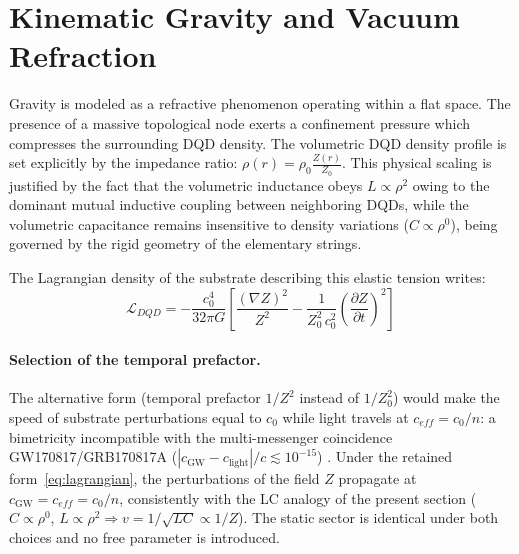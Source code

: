 \documentclass[11pt,a4paper]{article}
\theoremstyle{plain}
\theoremstyle{remark}
\begin{document}
\section{Kinematic Gravity and Vacuum Refraction}
\label{sec:kinematic_gravity}

Gravity is modeled as a refractive phenomenon operating within a flat space. The presence of a massive topological node exerts a confinement pressure which compresses the surrounding DQD density. The volumetric DQD density profile is set explicitly by the impedance ratio: $\rho(r) = \rho_0 \frac{Z(r)}{Z_0}$. This physical scaling is justified by the fact that the volumetric inductance obeys $L \propto \rho^2$ owing to the dominant mutual inductive coupling between neighboring DQDs, while the volumetric capacitance remains insensitive to density variations ($C \propto \rho^0$), being governed by the rigid geometry of the elementary strings.

The Lagrangian density of the substrate describing this elastic tension writes:
\begin{equation}\label{eq:lagrangian}
\mathcal{L}_{DQD} = - \frac{c_0^4}{32 \pi G} \left[ \frac{(\nabla Z)^2}{Z^2} - \frac{1}{Z_0^2\,c_0^2} \left( \frac{\partial Z}{\partial t} \right)^2 \right]
\end{equation}

\paragraph{Selection of the temporal prefactor.} The alternative form (temporal prefactor $1/Z^2$ instead of $1/Z_0^2$) would make the speed of substrate perturbations equal to $c_0$ while light travels at $c_{eff} = c_0/n$: a bimetricity incompatible with the multi-messenger coincidence GW170817/GRB170817A ($|c_{\text{GW}} - c_{\text{light}}|/c \lesssim 10^{-15}$) \cite{GW170817}. Under the retained form~\eqref{eq:lagrangian}, the perturbations of the field $Z$ propagate at $c_{\text{GW}} = c_{eff} = c_0/n$, consistently with the LC analogy of the present section ($C \propto \rho^0$, $L \propto \rho^2 \Rightarrow v = 1/\sqrt{LC} \propto 1/Z$). The static sector is identical under both choices and no free parameter is introduced.
\end{document}
